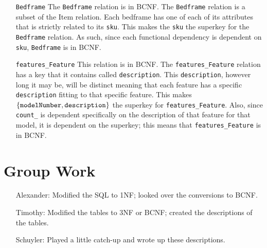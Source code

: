 \documentclass[american,extrafontsizes,12pt,portrait,letterpaper,oneside,onecolumn,article,final]{memoir}
\newcommand*\rnmath[1]{\(\displaystyle #1 \textstyle\)}
\newcommand*{\sqli}[1]{\texttt{#1}}
\newcommand*{\sqlm}[1]{\text{\sqli{#1}}}
\begin{document}
\begin{enumerate}[leftmargin=*,widest={\texttt{DistributionCenter}}]
\item[\sqli{Bedframe}]
The \sqli{Bedframe} relation is in BCNF.
The \sqli{Bedframe} relation is a subset of the Item relation.
Each bedframe has one of each of its attributes that is strictly related to its \sqli{sku}.
This makes the \sqli{sku} the superkey for the \sqli{Bedframe} relation.
As such, since each functional dependency is dependent on \sqli{sku}, \sqli{Bedframe} is in BCNF.

\item[\sqli{features_Feature}]
This relation is in BCNF.
The \sqli{features_Feature} relation has a key that it contains called \sqli{description}.
This \sqli{description}, however long it may be, will be distinct meaning that each feature has a specific \sqli{description} fitting to that specific feature.
This makes \rnmath{\{\sqlm{modelNumber}, \sqlm{description}\}} the superkey for \sqli{features_Feature}.
Also, since \sqli{count_} is dependent specifically on the description of that feature for that model, it is dependent on the superkey; this means that \sqli{features_Feature} is in BCNF.

\end{enumerate}

\section*{Group Work}
%
\begin{samepage}%
\begin{enumerate}[leftmargin=*,widest={Alexander:}]

\item[Alexander:]
%
Modified the SQL to 1NF; looked over the conversions to BCNF.

\item[Timothy:]
%
Modified the tables to 3NF or BCNF; created the descriptions of the tables.

\item[Schuyler:]
%
Played a little catch\hyp up and wrote up these descriptions.

\end{enumerate}%
\end{samepage}
\end{document}
